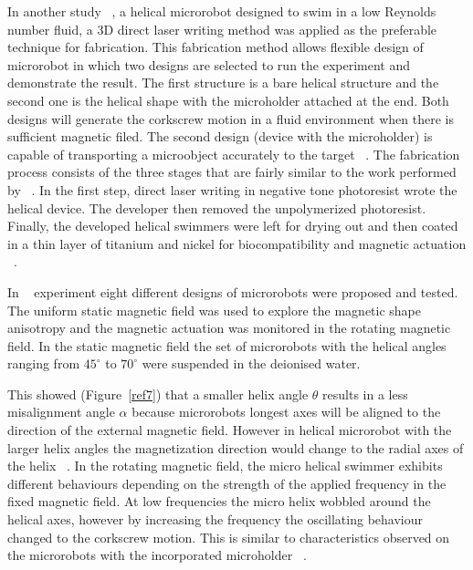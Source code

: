 \documentclass[a4paper,11pt]{article}
\begin{document}
\begin{sloppypar}
In another study ~\citep{tottori2012magnetic}, a helical microrobot designed to swim in a low Reynolds number fluid, a 3D 
direct laser writing method was applied as the preferable technique for fabrication. This fabrication 
method allows flexible design of microrobot in which two designs are selected to run the experiment 
and demonstrate the result. The first structure is a bare helical structure and the second one is the
 helical shape with the microholder attached at the end. Both designs will generate the corkscrew
 motion in a fluid environment when there is sufficient magnetic filed. The second 
design (device with the microholder) is capable of transporting a microobject accurately to the 
target ~\citep{tottori2012magnetic}.
The fabrication process consists of the three stages that are fairly similar to the work
 performed by ~\citeauthor{kim2013fabrication}. In the first step, direct laser writing in negative tone photoresist 
wrote the helical device. The developer then removed the unpolymerized photoresist. Finally, the 
developed helical swimmers were left for drying out and then coated in a thin layer of titanium and 
nickel for biocompatibility and magnetic actuation ~\citep{tottori2012magnetic}.

In ~\citeauthor{tottori2012magnetic} experiment eight different designs of microrobots were proposed and tested. 
The uniform static magnetic field was used to explore the magnetic shape anisotropy and the 
magnetic actuation was monitored in the rotating magnetic field. In the static magnetic field the 
set of microrobots with the helical angles ranging from ${45^{\circ}}$ to ${70^{\circ}}$ were suspended in the deionised water. 

This showed (Figure~\ref{ref7}) that a smaller helix angle $\theta$ results in a less misalignment 
angle $\alpha$ because microrobots longest axes will be aligned to the direction of the external magnetic field. 
However in helical microrobot with the larger helix angles the magnetization direction would change to 
the radial axes of the helix  ~\citep{tottori2012magnetic}.
In the rotating magnetic field, the micro helical swimmer exhibits different behaviours depending on 
the strength of the applied frequency in the fixed magnetic field. At low frequencies the micro helix wobbled 
around the helical axes, however by increasing the frequency the oscillating behaviour changed to the 
corkscrew motion. This is similar to characteristics observed on the microrobots with the incorporated
 microholder  ~\citep{tottori2012magnetic}. 


\end{sloppypar}
\end{document}

